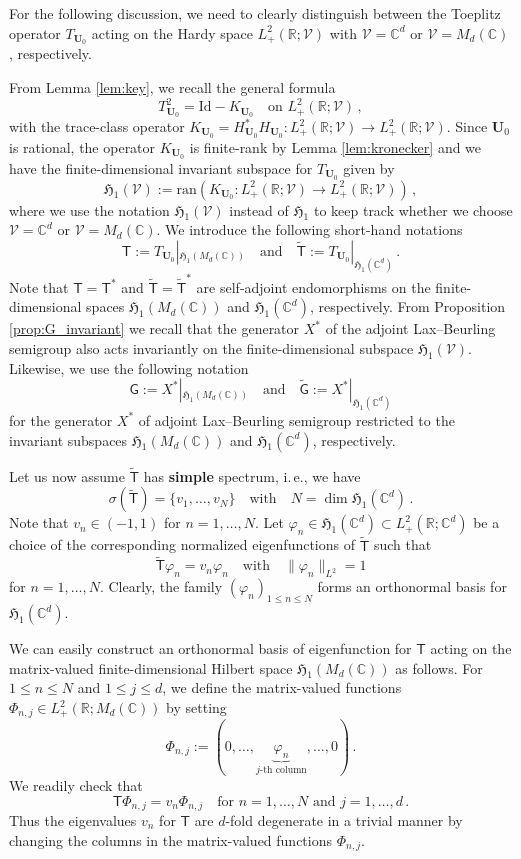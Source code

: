 \documentclass[11pt,reqno]{amsart}
\theoremstyle{definition}
\theoremstyle{remark}
\theoremstyle{remark}
\numberwithin{equation}{section}
\newcommand{\Hfr}{\mathfrak{H}}
\newcommand{\C}{\mathbb{C}}
\newcommand{\R}{\mathbb{R}}
\newcommand{\VV}{\mathcal{V}}
\newcommand{\ran}{\mathrm{ran}}
\newcommand{\be}{\begin{equation}}
\newcommand{\ee}{\end{equation}}
\newcommand{\Ub}{\mathbf{U}}
\newcommand{\id}{\mathrm{Id}}
\newcommand{\Ts}{\mathsf{T}}
\newcommand{\Tst}{\widetilde{\mathsf{T}}}
\newcommand{\Gs}{\mathsf{G}}
\newcommand{\Gst}{\widetilde{\Gs}}
\renewcommand{\phi}{\varphi}
\begin{document}
For the following discussion, we need to clearly distinguish between the Toeplitz operator $T_{\Ub_0}$ acting on the Hardy space $L^2_+(\R; \VV)$ with $\VV=\C^d$ or $\VV=M_d(\C)$, respectively. 



From Lemma \ref{lem:key}, we recall the general formula
\be \label{eq:T_key}
T_{\Ub_0}^2 = \id - K_{\Ub_0} \quad \mbox{on $L^2_+(\R; \VV)$} \, ,
\ee
with the trace-class operator $K_{\Ub_0} = H_{\Ub_0}^* H_{\Ub_0} : L^2_+(\R; \VV) \to L^2_+(\R; \VV)$. Since $\Ub_0$ is rational, the operator $K_{\Ub_0}$ is finite-rank by Lemma \ref{lem:kronecker} and we have the finite-dimensional invariant subspace for $T_{\Ub_0}$ given by
\be
\Hfr_1(\VV) := \ran ( K_{\Ub_0} : L^2_+(\R; \VV) \to L^2_+(\R; \VV) ) \, ,
\ee
where we use the notation $\Hfr_1(\VV)$ instead of $\Hfr_1$ to keep track whether we choose $\VV = \C^d$ or $\VV = M_d(\C)$. We introduce the following short-hand notations
\be
\Ts:= T_{\Ub_0} |_{\Hfr_1(M_d(\C))} \quad \mbox{and} \quad \Tst := T_{\Ub_0} |_{\Hfr_1(\C^d)} \, .
\ee
Note that $\Ts = \Ts^*$ and $\Tst = \Tst^*$ are self-adjoint endomorphisms on the finite-dimensional spaces $\Hfr_1(M_d(\C))$ and $\Hfr_1(\C^d)$, respectively. From Proposition \ref{prop:G_invariant} we recall that the generator $X^*$ of the adjoint Lax--Beurling semigroup also acts invariantly on the finite-dimensional subspace $\Hfr_1(\VV)$. Likewise, we use the following notation
\be
\Gs := X^* |_{\Hfr_1(M_d(\C))} \quad \mbox{and} \quad \Gst := X^* |_{\Hfr_1(\C^d)} 
\ee
for the generator $X^*$ of adjoint Lax--Beurling semigroup restricted to the invariant subspaces $\Hfr_1(M_d(\C))$ and $\Hfr_1(\C^d)$, respectively. 

Let us now assume $\Tst$ has \textbf{simple} spectrum, i.\,e., we have
\be \label{ass:Tst}
\sigma(\Tst) = \{ v_1, \ldots, v_N \} \quad \mbox{with} \quad N = \dim \Hfr_1(\C^d) \, .
\ee
Note that $v_n \in (-1,1)$ for $n = 1, \ldots, N$. Let $\phi_n \in \Hfr_1(\C^d) \subset L^2_+(\R; \C^d)$ be a choice of the corresponding normalized eigenfunctions of $\Tst$ such that
$$
\Tst \phi_n = v_n \phi_n \quad \mbox{with} \quad \| \phi_n \|_{L^2} = 1
$$
for $n=1, \ldots, N$. Clearly, the family $( \phi_n )_{1 \leq n \leq N}$ forms an orthonormal basis for $\Hfr_1(\C^d)$. 

We can easily construct an orthonormal basis of eigenfunction for $\Ts$ acting on the matrix-valued finite-dimensional Hilbert space $\Hfr_1(M_d(\C))$ as follows. For $1 \leq n \leq N$ and $1 \leq j \leq d$, we define the matrix-valued functions $\Phi_{n,j} \in L^2_+(\R; M_d(\C))$ by setting
\be
\Phi_{n,j}:= \left (0, \ldots, \underbrace{\phi_n}_{\mbox{$j$-th column}}, \ldots, 0 \right )  \, .
\ee
We readily check that
\be
\Ts \Phi_{n,j} = v_n \Phi_{n,j} \quad \mbox{for $n=1, \ldots, N$ and $j=1, \ldots, d$} \, . 
\ee
Thus the eigenvalues $v_n$ for $\Ts$ are $d$-fold degenerate in a trivial manner by changing the columns in the matrix-valued functions $\Phi_{n,j}$. 
\end{document}
